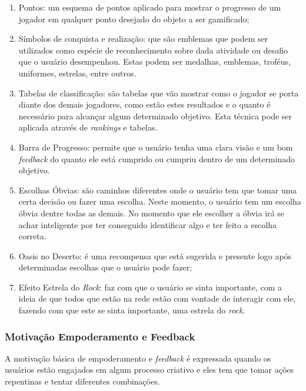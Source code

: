 \begin{enumerate}
    \item Pontos: um esquema de pontos aplicado para mostrar o progresso
        de um jogador em qualquer ponto desejado do objeto a ser gamificado;
    \item Símbolos de conquista e realização: que são emblemas que podem
        ser utilizados como espécie de reconhecimento sobre dada
        atividade ou desafio que o usuário desempenhou. Estas podem ser
        medalhas, emblemas, troféus, uniformes, estrelas, entre outros.
    \item Tabelas de classificação: são tabelas que vão mostrar como o
        jogador se porta diante dos demais jogadores, como
        estão estes resultados e o quanto é necessário para alcançar
        algum determinado objetivo. Esta técnica pode ser aplicada através
        de \textit{rankings} e tabelas.
    \item Barra de Progresso: permite que o usuário tenha uma clara visão
        e um bom \textit{feedback} do quanto ele está cumprido ou cumpriu dentro
        de um determinado objetivo.
    \item Escolhas Óbvias: são caminhos diferentes onde o usuário tem que tomar
        uma certa decisão ou fazer uma escolha. Neste momento, o usuário tem um
        escolha óbvia dentre todas as demais. No momento que ele escolher a óbvia
        irá se achar inteligente por ter conseguido identificar algo e ter
        feito a escolha correta.
    \item Oasis no Deserto: é uma recompensa que está sugerida e presente logo
        após determinadas escolhas que o usuário pode fazer;
    \item Efeito Estrela do \textit{Rock}: faz com que o usuário se sinta importante,
        com a ideia de que todos que estão na rede estão com vontade de interagir
        com ele, fazendo com que este se sinta importante, uma estrela do \textit{rock}.
\end{enumerate}

\subsubsection{Motivação Empoderamento e Feedback}
\label{sub:empoderamentoefeedback}
A motivação básica de empoderamento e \textit{feedback} é expressada quando os usuários
estão engajados em algum processo criativo e eles tem que tomar ações repentinas
e tentar diferentes combinações.

